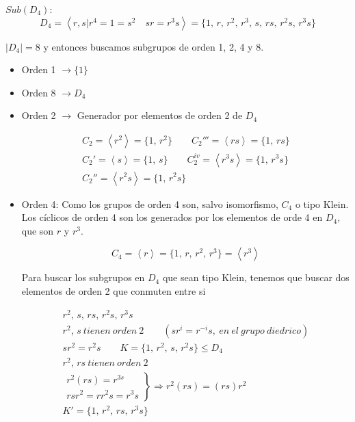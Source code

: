 \documentclass{article}
\begin{document}
$Sub(D_4):$
\begin{equation*}
D_4=\left\langle r,s|r^4=1=s^2\quad sr=r^3s\right\rangle=\{1,\,r,\,r^2,\,r^3,\,s,\,rs,\,r^2s,\,r^3s\}
\end{equation*}

$|D_4|=8$ y entonces buscamos subgrupos de orden 1, 2, 4 y 8.

\begin{itemize}
\item Orden 1 $\rightarrow \{1\}$ 

\item Orden 8 $\rightarrow D_4$ 

\item Orden 2 $\rightarrow$ Generador por elementos de orden 2 de $D_4$

\begin{gather*}
C_2=\left\langle r^2\right\rangle = \{1,\,r^2\} \qquad C_2'''=\left\langle rs\right\rangle = \{1,\,rs\} \\
C_2'=\left\langle s \right\rangle = \{1,\,s\} \qquad C_2^{iv}=\left\langle r^3s\right\rangle = \{1,\,r^3s\} \\
C_2''=\left\langle r^2s\right\rangle = \{1,\,r^2s\}
\end{gather*}

\item Orden 4: Como los grupos de orden 4 son, salvo isomorfismo, $C_4$ o tipo Klein. Los cíclicos de orden 4 son los generados por los elementos de orde 4 en $D_4$, que son $r$ y $r^3$.

\begin{equation*}
C_4=\left\langle r\right\rangle = \{1,\,r,\,r^2,\,r^3\}=\left\langle r^3\right\rangle
\end{equation*}

Para buscar los subgrupos en $D_4$ que sean tipo Klein, tenemos que buscar dos elementos de orden 2 que conmuten entre si

\begin{gather*}
r^2,\,s,\,rs,\,r^2s,\,r^3s \\
r^2,\,s \:tienen\:orden\:2 \qquad (sr^i=r^{-i}s,\:en\:el\:grupo\:diedrico) \\
sr^2=r^2s \qquad K=\{1,\,r^2,\,s,\,r^2s\}\leq D_4 \\
r^2,\, rs \:tienen\:orden\:2 \\
\left. \begin{array}{c}
r^2(rs)=r^{3s} \\
rsr^2=rr^2s=r^3s
\end{array} \right\rbrace \Rightarrow r^2(rs)=(rs)r^2 \\
K'=\{1,\,r^2,\,rs,\,r^3s\}
\end{gather*}
\end{itemize}
\end{document}
